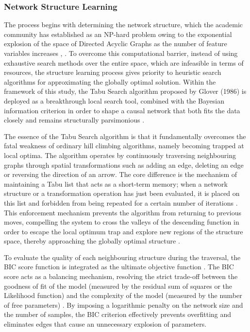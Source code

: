 \subsubsection{Network Structure Learning}
\noindent
The process begins with determining the network structure, which the academic community has established as an NP-hard problem owing to the exponential explosion of the space of Directed Acyclic Graphs as the number of feature variables increases \cite{koller2009probabilistic}, \cite{jensen2007bayesian} . To overcome this computational barrier, instead of using exhaustive search methods over the entire space, which are infeasible in terms of resources, the structure learning process gives priority to heuristic search algorithms for approximating the globally optimal solution. Within the framework of this study, the Tabu Search algorithm proposed by Glover (1986) \cite{koller2009probabilistic} is deployed as a breakthrough local search tool, combined with the Bayesian information criterion in order to shape a causal network that both fits the data closely and remains structurally parsimonious \cite{liu2024credit}.

The essence of the Tabu Search algorithm is that it fundamentally overcomes the fatal weakness of ordinary hill climbing algorithms, namely becoming trapped at local optima. The algorithm operates by continuously traversing neighbouring graphs through spatial transformations such as adding an edge, deleting an edge or reversing the direction of an arrow. The core difference is the mechanism of maintaining a Tabu list that acts as a short-term memory; when a network structure or a transformation operation has just been evaluated, it is placed on this list and forbidden from being repeated for a certain number of iterations \cite{spirtes2000causation}. This enforcement mechanism prevents the algorithm from returning to previous moves, compelling the system to cross the valleys of the descending function in order to escape the local optimum trap and explore new regions of the structure space, thereby approaching the globally optimal structure \cite{liu2024credit}.

To evaluate the quality of each neighbouring structure during the traversal, the BIC score function is integrated as the ultimate objective function \cite{koller2009probabilistic}. The BIC score acts as a balancing mechanism, resolving the strict trade-off between the goodness of fit of the model (measured by the residual sum of squares or the Likelihood function) and the complexity of the model (measured by the number of free parameters) \cite{liu2024credit}. By imposing a logarithmic penalty on the network size and the number of samples, the BIC criterion effectively prevents overfitting and eliminates edges that cause an unnecessary explosion of parameters.


